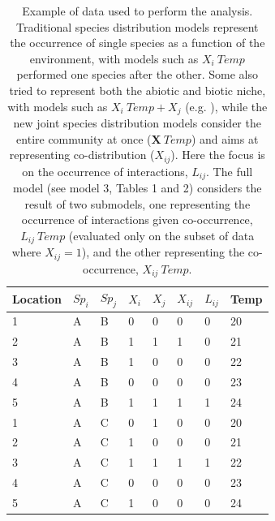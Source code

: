 \documentclass[12pt]{article}
\begin{document}
\begin{table}[]
\centering

\caption{Example of data used to perform the analysis. Traditional species distribution models represent the occurrence of single species as a function of the environment, with models such as $X_i­~Temp$ performed one species after the other. Some also tried to represent both the abiotic and biotic niche, with models such as $X_i­~Temp + X_j$ (e.g. \citealt{GonzalezSalasar2013}), while the new joint species distribution models \citep{Ovaskainen2017} consider the entire community at once ($\mathbf{X}~Temp$) and aims at representing co-distribution ($X_{ij}$). Here the focus is on the occurrence of interactions, $L_{ij}$. The full model (see model 3, Tables 1 and 2) considers the result of two submodels, one representing the occurrence of interactions given co-occurrence, $L_{ij}~Temp$ (evaluated only on the subset of data where $X_{ij}=1$), and the other representing the co-occurrence, $X_{ij}~Temp$.}

\begin{tabular}{llllllll}
\hline
	Location & $Sp_i$ & $Sp_j$ & $X_i$ & $X_j$ & $X_{ij}$ & $L_{ij}$ & Temp \\ \hline
	1 & A & B & 0 & 0 & 0 & 0 & 20 \\ 
	2 & A & B & 1 & 1 & 1 & 0 & 21 \\ 
	3 & A & B & 1 & 0 & 0 & 0 & 22 \\ 
	4 & A & B & 0 & 0 & 0 & 0 & 23 \\ 
	5 & A & B & 1 & 1 & 1 & 1 & 24 \\ 
	1 & A & C & 0 & 1 & 0 & 0 & 20 \\ 
	2 & A & C & 1 & 0 & 0 & 0 & 21 \\ 
	3 & A & C & 1 & 1 & 1 & 1 & 22 \\ 
	4 & A & C & 0 & 0 & 0 & 0 & 23 \\ 
	5 & A & C & 1 & 0 & 0 & 0 & 24 \\ 
\hline
\end{tabular}
\end{table}
\end{document}

